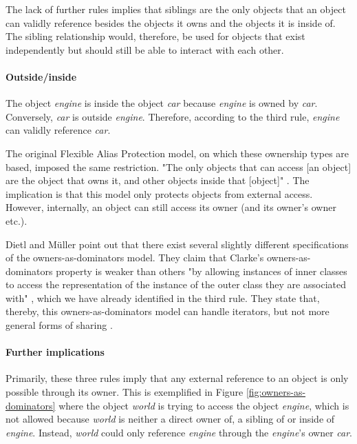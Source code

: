 \documentclass[sigplan,11pt,nonacm]{acmart}
\begin{document}
The lack of further rules implies that siblings are the only objects that an object can validly reference besides the objects it owns and the objects it is inside of.
The sibling relationship would, therefore, be used for objects that exist independently but should still be able to interact with each other.


\paragraph{Outside/inside}

The object \emph{engine} is inside the object \emph{car} because \emph{engine} is owned by \emph{car}.
Conversely, \emph{car} is outside \emph{engine}.
Therefore, according to the third rule, \emph{engine} can validly reference \emph{car}.

The original Flexible Alias Protection model, on which these ownership types are based, imposed the same restriction.
"The only objects that can access [an object] are the object that owns it, and other objects inside that [object]" \cite{flexible-alias-protection}.
The implication is that this model only protects objects from external access.
However, internally, an object can still access its owner (and its owner's owner etc.).

Dietl and Müller \cite{lightweight-ownership} point out that there exist several slightly different specifications of the owners-as-dominators model.
They claim that Clarke's owners-as-dominators property \cite{ownership-types-survey} is weaker than others "by allowing instances of inner classes to access the representation of the instance of the outer class they are associated with" \cite{lightweight-ownership}, which we have already identified in the third rule.
They state that, thereby, this owners-as-dominators model can handle iterators, but not more general forms of sharing \cite{lightweight-ownership}.


\paragraph{Further implications}

Primarily, these three rules imply that any external reference to an object is only possible through its owner.
This is exemplified in Figure \ref{fig:owners-as-dominators} where the object \emph{world} is trying to access the object \emph{engine}, which is not allowed because \emph{world} is neither a direct owner of, a sibling of or inside of \emph{engine}.
Instead, \emph{world} could only reference \emph{engine} through the \emph{engine}'s owner \emph{car}.
\end{document}
